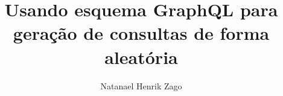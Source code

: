 \documentclass[portuguese,twoside]{UFFStex}
\author{Natanael Henrik Zago}
\title{Usando esquema GraphQL para geração de consultas de forma aleatória}{}
\begin{document}



\listoffigures
\listoftables
\tableofcontents
\nocite{belhadi2022,jin2018,graphql,higginbotham2015,hughes2016,karlsson2020graphql,mista2018,pagrut2018,palka2011,karlsson2020rest,vargas2018,zetterlund2021}







\end{document}
